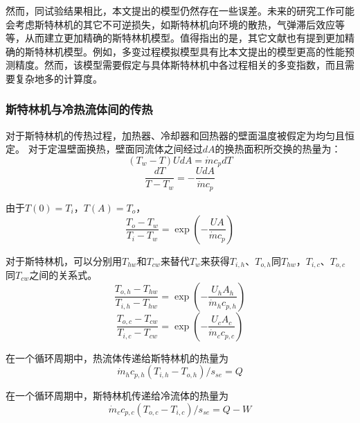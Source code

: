 然而，同试验结果相比，本文提出的模型仍然存在一些误差。未来的研究工作可能会考虑斯特林机的其它不可逆损失，如斯特林机向环境的散热，气弹滞后效应等等，从而建立更加精确的斯特林机模型。值得指出的是，其它文献也有提到更加精确的斯特林机模型。例如，多变过程模拟模型具有比本文提出的模型更高的性能预测精度\cite{Hosseinzade2015, Babaelahi2015}。然而，该模型需要假定与具体斯特林机中各过程相关的多变指数，而且需要复杂地多的计算度。

\subsubsection{斯特林机与冷热流体间的传热}

对于斯特林机的传热过程，加热器、冷却器和回热器的壁面温度被假定为均匀且恒定。
对于定温壁面换热，壁面同流体之间经过$dA$的换热面积所交换的热量为：
\begin{equation}
	(T_w-T)UdA = \dot{m}c_pdT
\end{equation}
\begin{equation}
	\frac{dT}{T-T_w}=-\frac{UdA}{\dot{m}c_p}
\end{equation}

由于$T(0)=T_i$，$T(A)=T_o$，
\begin{equation}
	\frac{T_o-T_w}{T_i-T_w}=\exp(-\frac{UA}{\dot{m}c_p})
\end{equation}

对于斯特林机，可以分别用$T_{hw}$和$T_{cw}$来替代$T_w$来获得$T_{i,h}$、$T_{o,h}$同$T_{hw}$，$T_{i,c}$、$T_{o,c}$同$T_{cw}$之间的关系式。
\begin{equation}
	\frac{T_{o,h}-T_{hw}}{T_{i,h}-T_{hw}}=\exp(-\frac{U_hA_h}{\dot{m}_hc_{p,h}})
	\label{Eq:T_h}
\end{equation}
\begin{equation}
	\frac{T_{o,c}-T_{cw}}{T_{i,c}-T_{cw}}=\exp(-\frac{U_cA_c}{\dot{m}_cc_{p,c}})
	\label{Eq:T_c}
\end{equation}

在一个循环周期中，热流体传递给斯特林机的热量为
\begin{equation}
	\dot{m}_hc_{p,h}(T_{i,h}-T_{o,h})/s_{se} = Q
	\label{Eq:q_h}
\end{equation}

在一个循环周期中，斯特林机传递给冷流体的热量为
\begin{equation}
	\dot{m}_cc_{p,c}(T_{o,c}-T_{i,c})/s_{se} = Q - W
	\label{Eq:q_c}
\end{equation}

